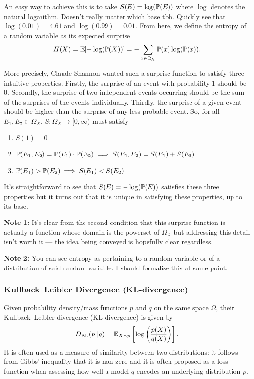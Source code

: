 \documentclass[11pt]{article}
\begin{document}
\begin{appendices}
An easy way to achieve this is to take $S(E)=\log(\P(E))$ where $\log$ denotes the natural logarithm. Doesn't really matter which base tbh. Quickly see that $\log(0.01)=4.61$ and $\log(0.99)=0.01$. From here, we define the entropy of a random variable as its expected surprise
$$
H(X)
=
\E[-\log(\P(X))]
=
-\sum_{x\in \Omega_X}\P(x)\log(\P(x)).
$$

\noindent More precisely, Claude Shannon wanted such a surprise function to satisfy three intuitive properties. Firstly, the surprise of an event with probability $1$ should be $0$. Secondly, the surprise of two independent events occurring should be the sum of the surprises of the events individually. Thirdly, the surprise of a given event should be higher than the surprise of any less probable event. So, for all $E_1,E_2\in\Omega_X$, $S:\Omega_X\rightarrow[0,\infty)$ must satisfy
\begin{enumerate}
    \item $S(1)=0$
    \item $\P(E_1,E_2)=\P(E_1)\cdot\P(E_2)\implies S(E_1,E_2)=S(E_1)+S(E_2)$
    \item $\P(E_1)>\P(E_2)\implies S(E_1)<S(E_2)$
\end{enumerate}
It's straightforward to see that $S(E)=-\log(\P(E))$ satisfies these three properties but it turns out that it is unique in satisfying these properties, up to its base.

\vspace{10pt}
\noindent\textbf{Note 1:} It's clear from the second condition that this surprise function is actually a function whose domain is the powerset of $\Omega_X$ but addressing this detail isn't worth it — the idea being conveyed is hopefully clear regardless.

\vspace{10pt}
\noindent\textbf{Note 2:} You can see entropy as pertaining to a random variable or of a distribution of said random variable. I should formalise this at some point.

\subsubsection{Kullback–Leibler Divergence (KL-divergence)}

Given probability density/mass functions $p$ and $q$ on the same space $\Omega$, their Kullback–Leibler divergence (KL-divergence) is given by
$$
D_{\text{KL}}(p||q)
=
\E_{X\sim p}\left[\log\left(\frac{p(X)}{q(X)}\right)\right].
$$
It is often used as a measure of similarity between two distributions: it follows from Gibbs' inequality that it is non-zero and it is often proposed as a loss function when assessing how well a model $q$ encodes an underlying distribution $p$.


\end{appendices}
\end{document}
